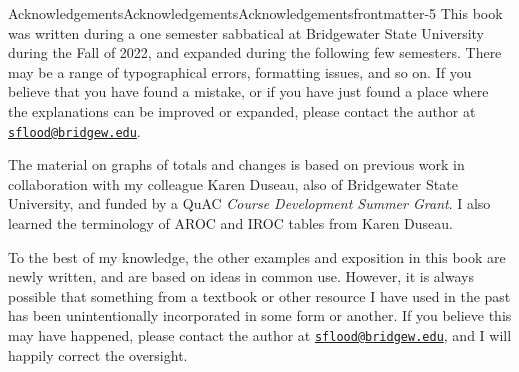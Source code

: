 \documentclass{tufte-book}
\numberwithin{equation}{chapter}
\begin{document}
\begin{acknowledgement}{Acknowledgements}{Acknowledgements}{}{Acknowledgements}{}{}{frontmatter-5}
This book was written during a one semester sabbatical at Bridgewater State University during the Fall of 2022, and expanded during the following few semesters. There may be a range of typographical errors, formatting issues, and so on. If you believe that you have found a mistake, or if you have just found a place where the explanations can be improved or expanded, please contact the author at \href{mailto:sflood@bridgew.edu}{\nolinkurl{sflood@bridgew.edu}}.%
\par
The material on graphs of totals and changes is based on previous work in collaboration with my colleague Karen Duseau, also of Bridgewater State University, and funded by a QuAC \emph{Course Development Summer Grant}. I also learned the terminology of AROC and IROC tables from Karen Duseau.%
\par
To the best of my knowledge, the other examples and exposition in this book are newly written, and are based on ideas in common use. However, it is always possible that something from a textbook or other resource I have used in the past has been unintentionally incorporated in some form or another. If you believe this may have happened, please contact the author at \href{mailto:sflood@bridgew.edu}{\nolinkurl{sflood@bridgew.edu}}, and I will happily correct the oversight.%
\end{acknowledgement}
\setcounter{tocdepth}{1}
\renewcommand*\contentsname{Contents}
\tableofcontents
\mainmatter
%
%
\typeout{************************************************}
\typeout{************************************************}
%
\end{document}
